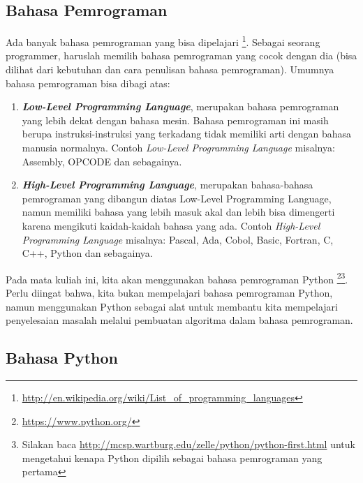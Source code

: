 \subsection{Bahasa Pemrograman}
Ada banyak bahasa pemrograman yang bisa dipelajari \footnote{\url{http://en.wikipedia.org/wiki/List_of_programming_languages}}. Sebagai seorang programmer, haruslah memilih bahasa pemrograman yang cocok dengan dia (bisa dilihat dari kebutuhan dan cara penulisan bahasa pemrograman). Umumnya bahasa pemrograman bisa dibagi atas: 
\begin{enumerate}
	\item \textbf{\textit{Low-Level Programming Language}}, merupakan bahasa pemrograman yang lebih dekat dengan bahasa mesin. Bahasa pemrograman ini masih berupa instruksi-instruksi yang terkadang tidak memiliki arti dengan bahasa manusia normalnya. Contoh \textit{Low-Level Programming Language} misalnya: Assembly, OPCODE dan sebagainya.
	\item \textbf{\textit{High-Level Programming Language}}, merupakan bahasa-bahasa pemrograman yang dibangun diatas Low-Level Programming Language, namun memiliki bahasa yang lebih masuk akal dan lebih bisa dimengerti karena mengikuti kaidah-kaidah bahasa yang ada. Contoh \textit{High-Level Programming Language} misalnya:	Pascal, Ada, Cobol, Basic, Fortran, C, C++, Python dan sebagainya.
	\end{enumerate}

Pada mata kuliah ini, kita akan menggunakan bahasa pemrograman Python \footnote{\url{https://www.python.org/}}\footnote{Silakan baca \url{http://mcsp.wartburg.edu/zelle/python/python-first.html} untuk mengetahui kenapa Python dipilih sebagai bahasa pemrograman yang pertama}. Perlu diingat bahwa, kita bukan mempelajari bahasa pemrograman Python, namun menggunakan Python sebagai alat untuk membantu kita mempelajari penyelesaian masalah melalui pembuatan algoritma dalam bahasa pemrograman.

\subsection{Bahasa Python}

